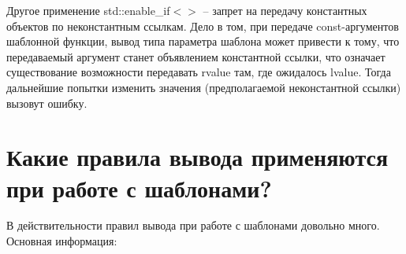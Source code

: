 \documentclass[a4paper,12pt]{article}	%
\begin{document}
	Другое применение std::enable\_if$<>$ -- запрет на передачу константных объектов по неконстантным ссылкам. Дело в том, при передаче const-аргументов шаблонной функции, вывод типа параметра шаблона может привести к тому, что передаваемый аргумент станет объявлением константной ссылки, что означает существование возможности передавать rvalue там, где ожидалось lvalue. Тогда дальнейшие попытки изменить значения (предполагаемой неконстантной ссылки) вызовут ошибку.

\newpage

\section{Какие правила вывода применяются при работе с шаблонами?}
	
	В действительности правил вывода при работе с шаблонами довольно много. Основная информация:
	
\end{document}
